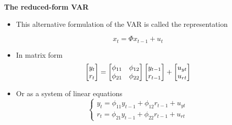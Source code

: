 \documentclass[10pt,english,t,aspectratio=169,ignorenonframetext]{beamer}
\begin{document}

\begin{frame}
{\textbf{The reduced-form VAR}}\bigskip

\begin{itemize}
\item This alternative formulation of the VAR is called the {%
}
representation 
\begin{equation*}
x_{t}=\Phi x_{t-1}+u_{t}
\end{equation*}%
\pause

\item In matrix form%
\begin{equation*}
\begin{bmatrix}
y_{t} \\ 
r_{t}%
\end{bmatrix}%
=%
\begin{bmatrix}
\phi _{11} & \phi _{12} \\ 
\phi _{21} & \phi _{22}%
\end{bmatrix}%
\begin{bmatrix}
y_{t-1} \\ 
r_{t-1}%
\end{bmatrix}%
+%
\begin{bmatrix}
u_{yt} \\ 
u_{rt}%
\end{bmatrix}%
\medskip
\end{equation*}

\item Or as a system of linear equations%
\begin{equation*}
\left\{ 
\begin{array}{c}
y_{t}=\phi _{11}y_{t-1}+\phi _{12}r_{t-1}+u_{yt} \\ 
r_{t}=\phi _{21}y_{t-1}+\phi _{22}r_{t-1}+u_{rt}%
\end{array}%
\right.
\end{equation*}
\end{itemize}
\end{frame}

\end{document}
